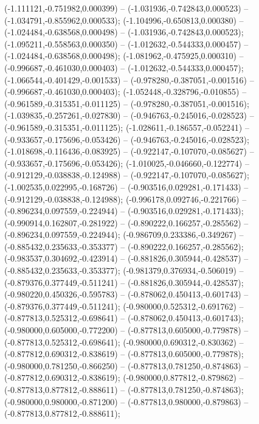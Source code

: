  (-1.111121,-0.751982,0.000399) -- (-1.031936,-0.742843,0.000523) -- (-1.034791,-0.855962,0.000533);
 (-1.104996,-0.650813,0.000380) -- (-1.024484,-0.638568,0.000498) -- (-1.031936,-0.742843,0.000523);
 (-1.095211,-0.558563,0.000350) -- (-1.012632,-0.544333,0.000457) -- (-1.024484,-0.638568,0.000498);
 (-1.081962,-0.475925,0.000310) -- (-0.996687,-0.461030,0.000403) -- (-1.012632,-0.544333,0.000457);
 (-1.066544,-0.401429,-0.001533) -- (-0.978280,-0.387051,-0.001516) -- (-0.996687,-0.461030,0.000403);
 (-1.052448,-0.328796,-0.010855) -- (-0.961589,-0.315351,-0.011125) -- (-0.978280,-0.387051,-0.001516);
 (-1.039835,-0.257261,-0.027830) -- (-0.946763,-0.245016,-0.028523) -- (-0.961589,-0.315351,-0.011125);
 (-1.028611,-0.186557,-0.052241) -- (-0.933657,-0.175696,-0.053426) -- (-0.946763,-0.245016,-0.028523);
 (-1.018698,-0.116436,-0.083925) -- (-0.922147,-0.107070,-0.085627) -- (-0.933657,-0.175696,-0.053426);
 (-1.010025,-0.046660,-0.122774) -- (-0.912129,-0.038838,-0.124988) -- (-0.922147,-0.107070,-0.085627);
 (-1.002535,0.022995,-0.168726) -- (-0.903516,0.029281,-0.171433) -- (-0.912129,-0.038838,-0.124988);
 (-0.996178,0.092746,-0.221766) -- (-0.896234,0.097559,-0.224944) -- (-0.903516,0.029281,-0.171433);
 (-0.990914,0.162807,-0.281922) -- (-0.890222,0.166257,-0.285562) -- (-0.896234,0.097559,-0.224944);
 (-0.986709,0.233386,-0.349267) -- (-0.885432,0.235633,-0.353377) -- (-0.890222,0.166257,-0.285562);
 (-0.983537,0.304692,-0.423914) -- (-0.881826,0.305944,-0.428537) -- (-0.885432,0.235633,-0.353377);
 (-0.981379,0.376934,-0.506019) -- (-0.879376,0.377449,-0.511241) -- (-0.881826,0.305944,-0.428537);
 (-0.980220,0.450326,-0.595783) -- (-0.878062,0.450413,-0.601743) -- (-0.879376,0.377449,-0.511241);
 (-0.980000,0.525312,-0.691762) -- (-0.877813,0.525312,-0.698641) -- (-0.878062,0.450413,-0.601743);
 (-0.980000,0.605000,-0.772200) -- (-0.877813,0.605000,-0.779878) -- (-0.877813,0.525312,-0.698641);
 (-0.980000,0.690312,-0.830362) -- (-0.877812,0.690312,-0.838619) -- (-0.877813,0.605000,-0.779878);
 (-0.980000,0.781250,-0.866250) -- (-0.877813,0.781250,-0.874863) -- (-0.877812,0.690312,-0.838619);
 (-0.980000,0.877812,-0.879862) -- (-0.877813,0.877812,-0.888611) -- (-0.877813,0.781250,-0.874863);
 (-0.980000,0.980000,-0.871200) -- (-0.877813,0.980000,-0.879863) -- (-0.877813,0.877812,-0.888611);
